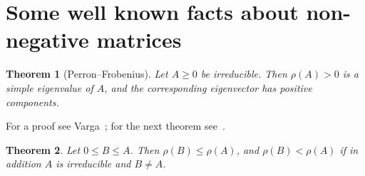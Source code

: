 \documentclass[11pt]{article}
\theoremstyle{plain}
\newtheorem{theorem}{Theorem}[section]
\theoremstyle{definition}
\theoremstyle{remark}
\numberwithin{equation}{section}
\numberwithin{figure}{section}
\numberwithin{table}{section}
\numberwithin{algorithm}{section}
\begin{document}
\section{Some well known facts about non-negative matrices}\label{sec-facts}

\begin{theorem}[Perron--Frobenius]\label{pf}
Let $A\ge 0$ be irreducible. Then $\rho(A)>0$ is a simple eigenvalue of $A$,
and the corresponding eigenvector has positive components.
\end{theorem}

For a proof see Varga~\cite[Theorem 2.7]{2000Varga-aa}; for the next
theorem see~\cite[Section 8.1]{1985Horn_Johnson}.

\begin{theorem}\label{mono}
Let $0\le B\le A$. Then $\rho(B)\le\rho(A)$, and $\rho(B)<\rho(A)$ if in
addition $A$ is irreducible and $B\neq A$.
\end{theorem}
\end{document}
